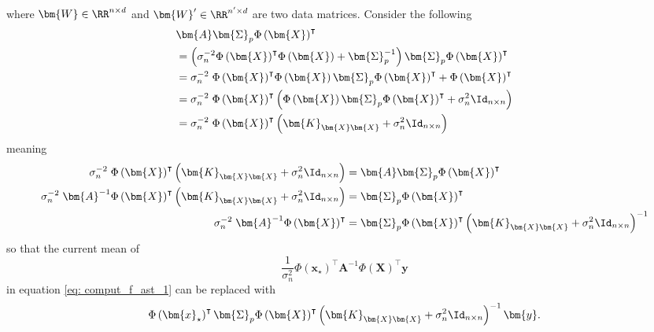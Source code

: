 where $\bm{W} \in \RR^{n \times d}$ and $\bm{W}' \in \RR^{n' \times d}$ are two data matrices. Consider the following
\begin{align*}
     & \bm{A} \bm{\Sigma}_p {\Phi \left( \bm{X} \right)}^{\intercal}                                                                                                                                \\
     & = \left( \sigma_n^{-2} {\Phi \left( \bm{X} \right)}^{\intercal} \Phi \left( \bm{X} \right) + \bm{\Sigma}_p^{-1} \right) \bm{\Sigma}_p {\Phi \left( \bm{X} \right)}^{\intercal}               \\
     & = \sigma_n^{-2} \; {\Phi \left( \bm{X} \right)}^{\intercal} \Phi \left( \bm{X} \right) \bm{\Sigma}_p {\Phi \left( \bm{X} \right)}^{\intercal} + {\Phi \left( \bm{X} \right)}^{\intercal}     \\
     & = \sigma_n^{-2} \; {\Phi \left( \bm{X} \right)}^{\intercal} \left( \Phi \left( \bm{X} \right) \bm{\Sigma}_p {\Phi \left( \bm{X} \right)}^{\intercal} + \sigma_n^{2} \Id_{n \times n} \right) \\
     & = \sigma_n^{-2} \; {\Phi \left( \bm{X} \right)}^{\intercal} \left( \bm{K}_{\bm{X} \bm{X}} + \sigma_n^{2} \Id_{n \times n} \right)
\end{align*}
meaning
\begin{align*}
    \sigma_n^{-2} \; {\Phi \left( \bm{X} \right)}^{\intercal} \left( \bm{K}_{\bm{X} \bm{X}} + \sigma_n^{2} \Id_{n \times n} \right)             & = \bm{A} \bm{\Sigma}_p {\Phi \left( \bm{X} \right)}^{\intercal}                                                                     \\
    \sigma_n^{-2} \; \bm{A}^{-1} {\Phi \left( \bm{X} \right)}^{\intercal} \left( \bm{K}_{\bm{X} \bm{X}} + \sigma_n^{2} \Id_{n \times n} \right) & = \bm{\Sigma}_p {\Phi \left( \bm{X} \right)}^{\intercal}                                                                            \\
    \sigma_n^{-2} \; \bm{A}^{-1} {\Phi \left( \bm{X} \right)}^{\intercal}                                                                       & = \bm{\Sigma}_p {\Phi \left( \bm{X} \right)}^{\intercal} \left( \bm{K}_{\bm{X} \bm{X}} + \sigma_n^{2} \Id_{n \times n} \right)^{-1}
\end{align*}
so that the current mean of
\[
    \frac{1}{\sigma_n^2} \Phi \left( \bm{x}_{\star} \right)^{\intercal} \bm{A}^{-1} {\Phi \left( \bm{X} \right)}^{\intercal} \bm{y}
\]
in equation \ref{eq: comput_f_ast_1} can be replaced with
\[
    \Phi \left( \bm{x}_{\star} \right)^{\intercal} \bm{\Sigma}_p {\Phi \left( \bm{X} \right)}^{\intercal} \left( \bm{K}_{\bm{X} \bm{X}} + \sigma_n^{2} \Id_{n \times n} \right)^{-1} \bm{y}.
\]
